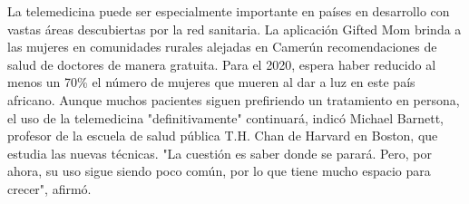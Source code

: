 \documentclass{article}%
\begin{document}
\newline%
%
La telemedicina puede ser especialmente importante en países en desarrollo con vastas áreas descubiertas por la red sanitaria. \newline%
\newline%
La aplicación Gifted Mom brinda a las mujeres en comunidades rurales alejadas en Camerún recomendaciones de salud de doctores de manera gratuita.%
\newline%
%
Para el 2020, espera haber reducido al menos un 70\% el número de mujeres que mueren al dar a luz en este país africano. \newline%
\newline%
Aunque muchos pacientes siguen prefiriendo un tratamiento en persona, el uso de la telemedicina "definitivamente" continuará, indicó Michael Barnett, profesor de la escuela de salud pública T.H. Chan de Harvard en Boston, que estudia las nuevas técnicas.%
\newline%
%
"La cuestión es saber donde se parará. Pero, por ahora, su uso sigue siendo poco común, por lo que tiene mucho espacio para crecer", afirmó.%
\newline%
%
\end{document}
